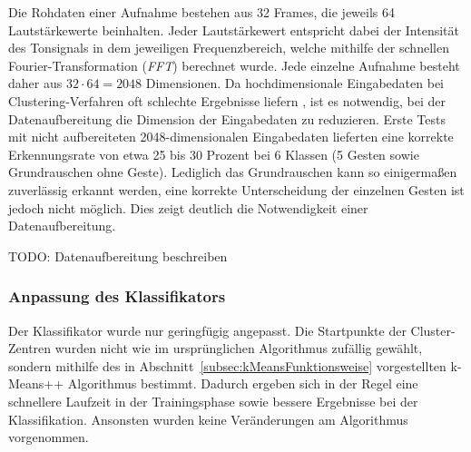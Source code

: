 Die Rohdaten einer Aufnahme bestehen aus 32 Frames, die jeweils 64 Lautstärkewerte beinhalten. Jeder Lautstärkewert entspricht dabei der Intensität des Tonsignals in dem jeweiligen Frequenzbereich, welche mithilfe der schnellen Fourier-Transformation (\emph{FFT}) \cite{fftMathebuch} berechnet wurde. Jede einzelne Aufnahme besteht daher aus $32 \cdot 64 = 2048$ Dimensionen.  Da hochdimensionale Eingabedaten bei Clustering-Verfahren oft schlechte Ergebnisse liefern \cite{kMeansHighDimensions}, ist es notwendig, bei der Datenaufbereitung die Dimension der Eingabedaten zu reduzieren.  Erste Tests mit nicht aufbereiteten 2048-dimensionalen Eingabedaten lieferten eine korrekte Erkennungsrate von etwa 25 bis 30 Prozent bei 6 Klassen (5 Gesten sowie Grundrauschen ohne Geste). Lediglich das Grundrauschen kann so einigermaßen zuverlässig erkannt werden, eine korrekte Unterscheidung der einzelnen Gesten ist jedoch nicht möglich. Dies zeigt deutlich die Notwendigkeit einer Datenaufbereitung.

TODO: Datenaufbereitung beschreiben 



\subsubsection{Anpassung des Klassifikators}
Der Klassifikator wurde nur geringfügig angepasst. Die Startpunkte der Cluster-Zentren wurden nicht wie im ursprünglichen Algorithmus zufällig gewählt, sondern mithilfe des in Abschnitt~\ref{subsec:kMeansFunktionsweise} vorgestellten k-Means++ Algorithmus bestimmt. Dadurch ergeben sich in der Regel eine schnellere Laufzeit in der Trainingsphase sowie bessere Ergebnisse bei der Klassifikation.
Ansonsten wurden keine Veränderungen am Algorithmus vorgenommen.

